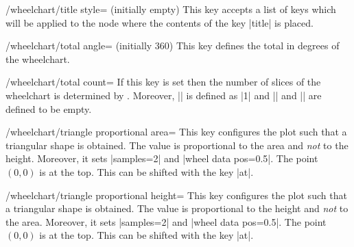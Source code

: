 \documentclass[a4paper,english,dvipsnames]{ltxdoc}
\begin{document}
\begin{stylekey}{/wheelchart/title style= (initially \normalfont empty)}
This key accepts a list of keys which will be applied to the node where the contents of the key |title| is placed.
\end{stylekey}
\begin{key}{/wheelchart/total angle= (initially 360)}
This key defines the total  in degrees of the wheelchart.
\end{key}
\begin{key}{/wheelchart/total count=}
If this key is set then the number of slices of the wheelchart is determined by . Moreover, |\WCvarA| is defined as |1| and |\WCvarB| and |\WCvarC| are defined to be empty.
\begin{codeexample}[width=10cm,preamble={\usepackage{siunitx}}]
\end{codeexample}
\end{key}
\begin{key}{/wheelchart/triangle proportional area=}
This key configures the plot such that a triangular shape is obtained. The value is proportional to the area and \emph{not} to the height. Moreover, it sets |samples=2| and |wheel data pos=0.5|. The point $(0,0)$ is at the top. This can be shifted with the key |at|.
\begin{codeexample}[width=10cm]
\begin{tikzpicture}
\wheelchart[
    triangle proportional area={5}{4},
    value=1
]{\exampleforthismanual}
\end{tikzpicture}
\end{codeexample}
\end{key}
\begin{key}{/wheelchart/triangle proportional height=}
This key configures the plot such that a triangular shape is obtained. The value is proportional to the height and \emph{not} to the area. Moreover, it sets |samples=2| and |wheel data pos=0.5|. The point $(0,0)$ is at the top. This can be shifted with the key |at|.
\begin{codeexample}[width=10cm]
\begin{tikzpicture}
\wheelchart[
    triangle proportional height={5}{4},
    value=1
]{\exampleforthismanual}
\end{tikzpicture}
\end{codeexample}
\end{key}
\end{document}
